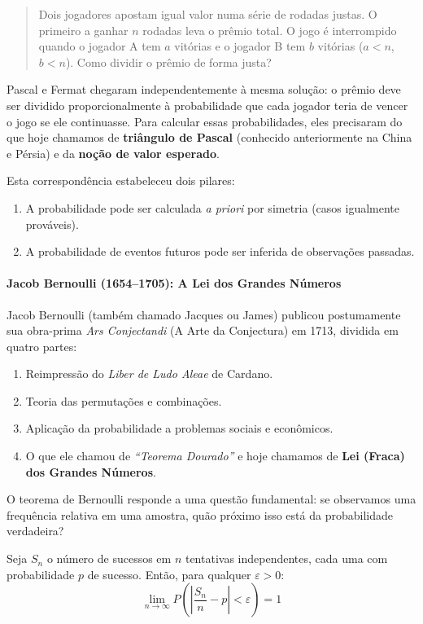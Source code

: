 \documentclass{tufte-handout}
\begin{document}
\begin{quote}
    Dois jogadores apostam igual valor numa série de rodadas justas. O primeiro a ganhar
    $n$ rodadas leva o prêmio total. O jogo é interrompido quando o jogador A tem $a$ vitórias
    e o jogador B tem $b$ vitórias ($a < n$, $b < n$). Como dividir o prêmio de forma justa?
\end{quote}

Pascal e Fermat chegaram independentemente à mesma solução: o prêmio deve ser dividido
proporcionalmente à probabilidade que cada jogador teria de vencer o jogo se ele continuasse.
Para calcular essas probabilidades, eles precisaram do que hoje chamamos de \textbf{triângulo de Pascal}
(conhecido anteriormente na China e Pérsia) e da \textbf{noção de valor esperado}.

Esta correspondência estabeleceu dois pilares:
\begin{enumerate}
    \item A probabilidade pode ser calculada \textit{a priori} por simetria (casos igualmente prováveis).
    \item A probabilidade de eventos futuros pode ser inferida de observações passadas.
\end{enumerate}

\paragraph{Jacob Bernoulli (1654--1705): A Lei dos Grandes Números}

Jacob Bernoulli (também chamado Jacques ou James) publicou postumamente sua obra-prima
\textit{Ars Conjectandi} (A Arte da Conjectura) em 1713, dividida em quatro partes:
\begin{enumerate}
    \item Reimpressão do \textit{Liber de Ludo Aleae} de Cardano.
    \item Teoria das permutações e combinações.
    \item Aplicação da probabilidade a problemas sociais e econômicos.
    \item O que ele chamou de \textit{``Teorema Dourado''} e hoje chamamos de
    \textbf{Lei (Fraca) dos Grandes Números}.
\end{enumerate}

O teorema de Bernoulli responde a uma questão fundamental: se observamos uma frequência
relativa em uma amostra, quão próximo isso está da probabilidade verdadeira?

\begin{thm}[Bernoulli, 1713]
    Seja $S_n$ o número de sucessos em $n$ tentativas independentes, cada uma com
    probabilidade $p$ de sucesso. Então, para qualquer $\varepsilon > 0$:
    \[
    \lim_{n \to \infty} P\left(\left|\frac{S_n}{n} - p\right| < \varepsilon\right) = 1
    \]
\end{thm}
\end{document}
